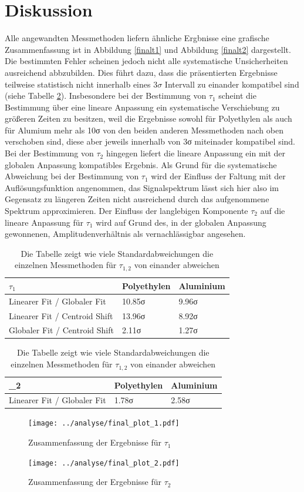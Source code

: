 \documentclass[a4paper,12pt]{article}
\begin{document}
\section{Diskussion}
Alle angewandten Messmethoden liefern ähnliche Ergbnisse eine grafische Zusammenfassung ist in Abbildung \ref{finalt1} und Abbildung \ref{finalt2} dargestellt. 
Die bestimmten Fehler scheinen jedoch nicht alle systematische Unsicherheiten ausreichend abbzubilden. 
Dies führt dazu, dass die präsentierten Ergebnisse teilweise statistisch nicht innerhalb eines $3\sigma$ Intervall
zu einander kompatibel sind (siehe Tabelle \ref{tab:finalsigma}). Insbesondere bei der Bestimmung von $\tau_{1}$ scheint die Bestimmung über eine
lineare Anpassung ein systematische Verschiebung zu größeren Zeiten zu besitzen, weil die Ergebnisse sowohl für Polyethylen als auch für Alumium mehr als 
10σ von den beiden anderen Messmethoden nach oben verschoben sind, diese aber jeweils innerhalb von 3σ miteinader kompatibel sind. Bei der Bestimmung von $\tau_{2}$
hingegen liefert die lineare Anpassung ein mit der globalen Anpassung kompatibles Ergebnis. Als Grund für die systematische Abweichung bei der 
Bestimmung von $\tau_{1}$ wird der Einfluss der Faltung mit der Auflösungsfunktion angenommen, das Signalspektrum lässt sich hier also im Gegensatz zu längeren
Zeiten nicht ausreichend durch das aufgenommene Spektrum approximieren. Der Einfluss der langlebigen Komponente $\tau_{2}$ auf die lineare Anpassung für $\tau_{1}$
wird auf Grund des, in der globalen Anpassung gewonnenen, Amplitudenverhältnis als vernachlässigbar angesehen.   

\begin{table}[h]
	\begin{tabular}{|l |l |l |}
	\hline
	$\tau_{1}$ & Polyethylen & Aluminium \\
	\hline
	\hline
	Linearer Fit / Globaler Fit & 10.85σ & 9.96σ \\
	\hline
	Linearer Fit / Centroid Shift & 13.96σ & 8.92σ  \\
	\hline
	Globaler Fit / Centroid Shift &  2.11σ & 1.27σ \\
	\hline
	\end{tabular}

	\vspace*{0.5cm}
	\begin{tabular}{|l |l |l |}
		\hline
	\tau_{2} & Polyethylen & Aluminium\\
	\hline
	\hline
	Linearer Fit / Globaler Fit\hspace*{0.37cm} & 1.78σ & 2.58σ\\
	\hline
	\end{tabular}
	
	\caption{Die Tabelle zeigt wie viele Standardabweichungen die einzelnen Messmethoden für $\tau_{1,2}$ von einander abweichen}
	\label{tab:finalsigma}
\end{table} 
\begin{figure}[h]
	\texttt{[image: ../analyse/final\_plot\_1.pdf]}
	\caption{Zusammenfassung der Ergebnisse für $\tau_{1}$ }
	\label{fig:finalt1}
\end{figure}

\begin{figure}[h]
	\texttt{[image: ../analyse/final\_plot\_2.pdf]}
	\caption{Zusammenfassung der Ergebnisse für $\tau_{2}$ }
	\label{fig:finalt2}
\end{figure}


{}
\end{document}
